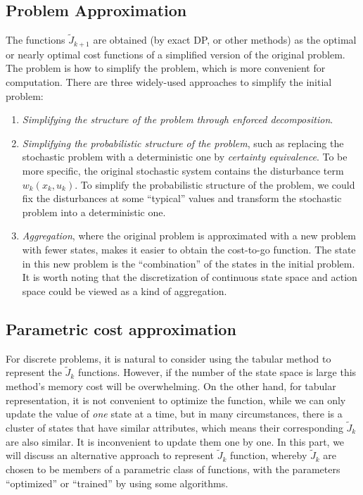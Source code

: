 \documentclass[
]{book}
\theoremstyle{definition}
\theoremstyle{definition}
\theoremstyle{definition}
\theoremstyle{definition}
\theoremstyle{remark}
\begin{document}
\hypertarget{problem-approximation}{%
\subsection{Problem Approximation}\label{problem-approximation}}

The functions \(\tilde J_{k+1}\) are obtained (by exact DP, or other methods) as the optimal or nearly optimal cost functions of a simplified version of the original problem. The problem is how to simplify the problem, which is more convenient for computation. There are three widely-used approaches to simplify the initial problem:

\begin{enumerate}
\def\labelenumi{\arabic{enumi}.}
\item
  \emph{Simplifying the structure of the problem through enforced decomposition}.
\item
  \emph{Simplifying the probabilistic structure of the problem}, such as replacing the stochastic problem with a deterministic one by \emph{certainty equivalence}. To be more specific, the original stochastic system contains the disturbance term \(w_k(x_k,u_k)\). To simplify the probabilistic structure of the problem, we could fix the disturbances at some ``typical'' values and transform the stochastic problem into a deterministic one.
\item
  \emph{Aggregation}, where the original problem is approximated with a new problem with fewer states, makes it easier to obtain the cost-to-go function. The state in this new problem is the ``combination'' of the states in the initial problem. It is worth noting that the discretization of continuous state space and action space could be viewed as a kind of aggregation.
\end{enumerate}

\hypertarget{parametric-cost-approximation}{%
\subsection{Parametric cost approximation}\label{parametric-cost-approximation}}

For discrete problems, it is natural to consider using the tabular method to represent the \(\tilde J_k\) functions. However, if the number of the state space is large this method's memory cost will be overwhelming. On the other hand, for tabular representation, it is not convenient to optimize the function, while we can only update the value of \emph{one} state at a time, but in many circumstances, there is a cluster of states that have similar attributes, which means their corresponding \(\tilde J_k\) are also similar.
It is inconvenient to update them one by one. In this part, we will discuss an alternative approach to represent \(\tilde J_k\) function, whereby \(\tilde J_k\) are chosen to be members of a parametric class of functions, with the parameters ``optimized'' or ``trained'' by using some algorithms.
\end{document}
